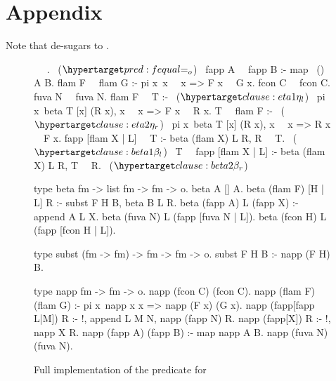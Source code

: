 \section*{Appendix}

Note that  de-sugars to .

\begin{figure*}
\begin{elpicode}
~  ~.                           ~($\customlabel{pred:fequal}{\Eo}$)~
fapp A ~\Eo~fapp B :- map ~(\Eo)~ A B.
flam F ~\Eo~flam G :- pi x\ x ~\Eo~x => F x ~\Eo~G x.
fcon C ~\Eo~fcon C.
fuva N ~\Eo~fuva N.
flam F ~\Eo~T :-                                       ~($\customlabel{clause:eta1}{\eta_l}$)~
  pi x\ beta T [x] (R x), x ~\Eo~x => F x ~\Eo~R x.
T ~\Eo~flam F :-                                       ~($\customlabel{clause:eta2}{\eta_r}$)~
  pi x\ beta T [x] (R x), x ~\Eo~x => R x ~\Eo~F x.
fapp [flam X | L] ~\Eo~T :- beta (flam X) L R, R ~\Eo~T. ~($\customlabel{clause:beta1}{\beta_l}$)~
T ~\Eo~fapp [flam X | L] :- beta (flam X) L R, T ~\Eo~R. ~($\customlabel{clause:beta2}{\beta_r}$)~

type beta fm -> list fm -> fm -> o.
beta A [] A.
beta (flam F) [H | L] R :- subst F H B,
  beta B L R. %
beta (fapp A) L (fapp X) :- append A L X.
beta (fuva N) L (fapp [fuva N | L]).
beta (fcon H) L (fapp [fcon H | L]).

type subst (fm -> fm) -> fm -> fm -> o.
subst F H B :- napp (F H) B. %

type napp fm -> fm -> o.
napp (fcon C) (fcon C).
napp (flam F) (flam G) :- pi x\ napp x x => napp (F x) (G x).
napp (fapp[fapp L|M]) R :- !, append L M N, napp (fapp N) R.
napp (fapp[X]) R :- !, napp X R.
napp (fapp A) (fapp B) :- map napp A B.
napp (fuva N) (fuva N).
\end{elpicode}
\caption{Full implementation of the \Eo predicate for \Fo}
\label{code:eo-pred}
\end{figure*}

